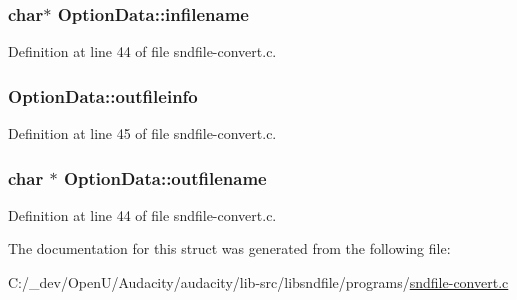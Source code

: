 \subsubsection[{\texorpdfstring{infilename}{infilename}}]{\setlength{\rightskip}{0pt plus 5cm}char$\ast$ Option\+Data\+::infilename}\hypertarget{struct_option_data_a248bc231164132ff17fc7da4dcc7808f}{}\label{struct_option_data_a248bc231164132ff17fc7da4dcc7808f}


Definition at line 44 of file sndfile-\/convert.\+c.

\subsubsection[{\texorpdfstring{outfileinfo}{outfileinfo}}]{ Option\+Data\+::outfileinfo}\hypertarget{struct_option_data_a3c3ca50a184e03c480830775473b1a1d}{}\label{struct_option_data_a3c3ca50a184e03c480830775473b1a1d}


Definition at line 45 of file sndfile-\/convert.\+c.

\subsubsection[{\texorpdfstring{outfilename}{outfilename}}]{\setlength{\rightskip}{0pt plus 5cm}char $\ast$ Option\+Data\+::outfilename}\hypertarget{struct_option_data_ae97172c3e0c5475ea8c2e5c0be75e0cc}{}\label{struct_option_data_ae97172c3e0c5475ea8c2e5c0be75e0cc}


Definition at line 44 of file sndfile-\/convert.\+c.



The documentation for this struct was generated from the following file\+:\begin{DoxyCompactItemize}
\item 
C\+:/\+\_\+dev/\+Open\+U/\+Audacity/audacity/lib-\/src/libsndfile/programs/\hyperlink{sndfile-convert_8c}{sndfile-\/convert.\+c}\end{DoxyCompactItemize}
